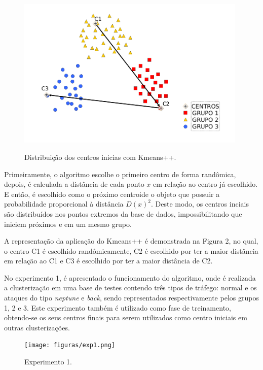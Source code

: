 \begin{figure}[!h]
\centering
\includegraphics[width = 11cm, height = 8cm]{figuras/kmeans++.png}
\caption{\scriptsize{Distribuição dos centros inicias com Kmeans++.}}
\end{figure}

\indent Primeiramente, o algoritmo escolhe o primeiro centro de forma randômica, depois, é calculada a distância de cada ponto $x$ em relação ao centro já escolhido. E então, é escolhido como o próximo centroide o objeto que possuir a probabilidade proporcional à distância $D(x)^{2}$. Deste modo, os centros inciais são distribuídos nos pontos extremos da base de dados, impossibilitando que iniciem próximos e em um mesmo grupo.

\indent A representação da aplicação do Kmeans++ é demonstrada na Figura 2, no qual, o centro C1 é escolhido randômicamente, C2 é escolhido por ter a maior distância em relação ao C1 e C3 é escolhido por ter a maior distância de C2.

\indent No experimento 1, é apresentado o funcionamento do algoritmo, onde  é realizada a clusterização em uma base de testes contendo três tipos de tráfego: normal e os ataques do tipo \textit{neptune} e \textit{back}, sendo representados respectivamente pelos grupos 1, 2 e 3. Este experimento também é utilizado como fase de treinamento, obtendo-se os seus centros finais para serem utilizados como centro iniciais em outras clusterizações.
  
\begin{figure}[!h]
\centering
\texttt{[image: figuras/exp1.png]}
\caption{\scriptsize{Experimento 1.}}
\end{figure}

